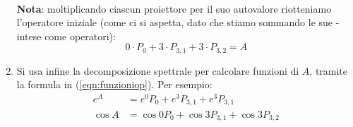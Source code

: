 \begin{enumerate}
\begin{align*}
	\end{align*}
\textbf{Nota}: moltiplicando ciascun proiettore per il suo autovalore riotteniamo l'operatore iniziale (come ci si aspetta, dato che stiamo sommando le sue  - intese come operatori):
\[
0\cdot P_0+3\cdot P_{3,1}+3\cdot P_{3,2}=A
\]
\item Si usa infine la decomposizione spettrale per calcolare funzioni di $A$, tramite la formula in (\ref{eqn:funzioniop}). Per esempio:
\begin{align*}
    e^A&=e^0P_0+e^3P_{3,1}+e^3P_{3,1}\\
    \cos A &= \cos 0 P_0 + \cos 3 P_{3,1} + \cos 3 P_{3,2}
\end{align*}
\end{enumerate}

%